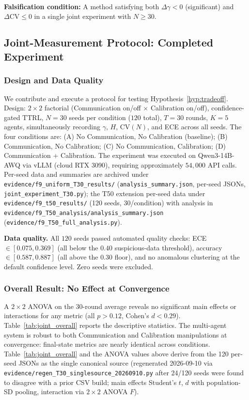 \documentclass[11pt]{article}
\newcommand{\CV}{\ensuremath{\mathrm{CV}}}
\theoremstyle{definition}
\theoremstyle{remark}
\begin{document}
\textbf{Falsification condition:} A method satisfying both $\Delta\gamma < 0$ (significant) and $\Delta\CV \leq 0$ in a single joint experiment with $N \geq 30$.

\subsection{Joint-Measurement Protocol: Completed Experiment}\label{sec:joint}

\subsubsection{Design and Data Quality}

We contribute and execute a protocol for testing Hypothesis~\ref{hyp:tradeoff}. Design: $2 \times 2$ factorial (Communication on/off $\times$ Calibration on/off), confidence-gated TTRL, $N{=}30$ seeds per condition ($120$ total), $T{=}30$ rounds, $K{=}5$ agents, simultaneously recording $\gamma$, $H$, $\CV(N)$, and ECE across all seeds. The four conditions are: (A) No Communication, No Calibration (baseline); (B) Communication, No Calibration; (C) No Communication, Calibration; (D) Communication + Calibration. The experiment was executed on Qwen3-14B-AWQ via vLLM (cloud RTX 3090), requiring approximately $54{,}000$ API calls. Per-seed data and summaries are archived under \texttt{evidence/f9\_uniform\_T30\_results/} (\texttt{analysis\_summary.json}, per-seed JSONs, \texttt{joint\_experiment\_T30.py}); the T50 extension per-seed data under \texttt{evidence/f9\_t50\_results/} (120 seeds, 30/condition) with analysis in \texttt{evidence/f9\_T50\_analysis/analysis\_summary.json} (\texttt{evidence/f9\_T50\_full\_analysis.py}).

\textbf{Data quality.} All $120$ seeds passed automated quality checks: ECE $\in [0.075, 0.369]$ (all below the $0.40$ suspicious-data threshold), accuracy $\in [0.587, 0.887]$ (all above the $0.30$ floor), and no anomalous clustering at the default confidence level. Zero seeds were excluded.

\subsubsection{Overall Result: No Effect at Convergence}

A $2 \times 2$ ANOVA on the 30-round average reveals no significant main effects or interactions for any metric (all $p > 0.12$, Cohen's $d < 0.29$). Table~\ref{tab:joint_overall} reports the descriptive statistics. The multi-agent system is robust to both Communication and Calibration manipulations at convergence: final-state metrics are nearly identical across conditions. Table~\ref{tab:joint_overall} and the ANOVA values above derive from the 120 per-seed JSONs as the single canonical source (regenerated 2026-09-10 via \texttt{evidence/regen\_T30\_singlesource\_20260910.py} after 24/120 seeds were found to disagree with a prior CSV build; main effects Student's $t$, $d$ with population-SD pooling, interaction via $2{\times}2$ ANOVA $F$).
\end{document}
